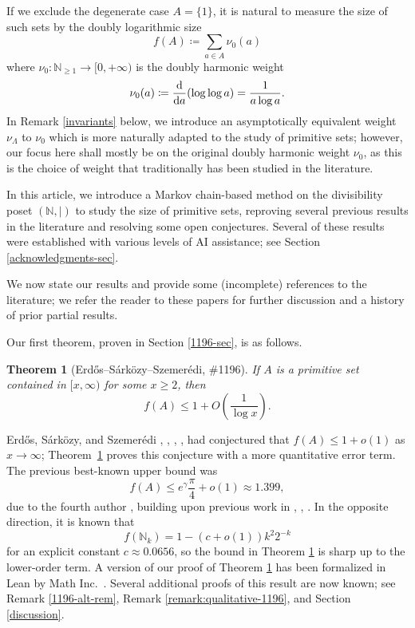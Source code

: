 \documentclass[12pt]{amsart}
\newtheorem{theorem}{Theorem}[section]
\theoremstyle{definition}
\theoremstyle{remark}
\numberwithin{equation}{section}
\newcommand{\N}{{\mathbb N}}
\newcommand{\nuMangoldt}{\nu_{\Lambda}}
\newcommand{\1}{{\mathbf 1}}
\newcommand{\Erdos}{{Erd\H{o}s}}
\begin{document}
If we exclude the degenerate case $A = \{1\}$, it is natural to measure the size of such sets by the doubly logarithmic size
$$f(A)\coloneq \sum_{a\in A} \nu_0(a)$$
where $\nu_0 \colon \N_{\geq 1} \to [0,+\infty)$ is the doubly harmonic weight
\begin{equation}\label{nu-def} \nu_0(a) \coloneq \dv{a}(\log\log a) = \frac{1}{a\log a}.
\end{equation}
In Remark \ref{invariants} below, we introduce an asymptotically equivalent weight $\nuMangoldt$ to $\nu_0$ which is more naturally adapted to the study of primitive sets; however, our focus here shall mostly be on the original doubly harmonic weight $\nu_0$, as this is the choice of weight that traditionally has been studied in the literature.

In this article, we introduce a Markov chain-based method on the divisibility poset $(\N,|)$ to study the size of primitive sets, reproving several previous results in the literature and resolving some open conjectures.  Several of these results were established with various levels of AI assistance; see Section \ref{acknowledgments-sec}.

We now state our results and provide some (incomplete) references to the literature; we refer the reader to these papers for further discussion and a history of prior partial results.

Our first theorem, proven in Section \ref{1196-sec}, is as follows.

\begin{theorem}[\Erdos{}--S\'ark\"ozy--Szemer\'edi, \#1196] \label{conj:1196}
If $A$ is a primitive set contained in $[x,\infty)$ for some $x \geq 2$, then
$$f(A) \leq 1 + O\left(\frac{1}{\log x}\right).$$
\end{theorem}

\Erdos{}, S\'ark\"ozy, and Szemer\'edi \cite[(20)]{ess2}, \cite[p.~101]{erdos-survey}, \cite[p. 244, Problem 2.2]{sarkozy1}, \cite[p. 224, Problem 2]{sarkozy2},
\cite[Problem \#1196]{bloom} had conjectured that $f(A) \leq 1+o(1)$ as $x \to \infty$; Theorem~\ref{conj:1196} proves this conjecture with a more quantitative error term.  The previous best-known upper bound was
$$ f(A) \leq e^\gamma \frac{\pi}{4} + o(1) \approx 1.399,$$
due to the fourth author \cite{Lichtman}, building upon previous work in \cite{ezhang}, \cite{zhang1}, \cite{zhang2}.  In the opposite direction, it is known \cite{glw} that
\begin{equation}\label{nk}
f(\N_k) = 1 - (c+o(1)) k^2 2^{-k}
\end{equation}
for an explicit constant $c \approx 0.0656$, so the bound in Theorem \ref{conj:1196} is sharp up to the lower-order term.  A version of our proof of Theorem \ref{conj:1196} has been formalized in Lean by Math Inc.~\cite{lean-erdos1196}.  Several additional proofs of this result are now known; see Remark \ref{1196-alt-rem}, Remark \ref{remark:qualitative-1196}, and Section \ref{discussion}.  
\end{document}
